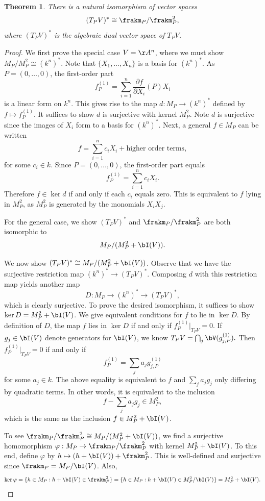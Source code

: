 \documentclass[12pt]{amsart}
\theoremstyle{plain}
\newtheorem{theorem}{Theorem}[subsection]
\theoremstyle{definition}
\begin{document}
\begin{theorem}
There is a natural isomorphism of vector spaces
$$(T_PV)^* \cong \frakm_P/\frakm_P^2,$$
where $(T_PV)^*$ is the algebraic dual vector space of $T_PV$.
\end{theorem}
\begin{proof}
We first prove the special case $V=\AA^n$, where we must show $M_P/M_P^2\cong(k^n)^*$.
Note that $\{X_1, \ldots, X_n\}$ is a basis for $(k^n)^*$.
As $P=(0, \ldots, 0)$, the first-order part
$$f_P^{(1)}=\sum_{i=1}^n \frac{\partial f}{\partial X_i}(P) X_i$$
is a linear form on $k^n$.
This gives rise to the map $d : M_P\to(k^n)^*$ defined by $f \mapsto f_P^{(1)}$.
It suffices to show $d$ is surjective with kernel $M_P^2$.
Note $d$ is surjective since the images of $X_i$ form to a basis for $(k^n)^*$.
Next, a general $f \in M_P$ can be written
$$f=\sum_{i=1}^n c_i X_i + \text{higher order terms},$$
for some $c_i \in k$.
Since $P=(0,\ldots,0)$, the first-order part equals
$$f_P^{(1)} = \sum_{i=1}^n c_i X_i.$$
Therefore $f \in \ker d$ if and only if each $c_i$ equals zero.
This is equivalent to $f$ lying in $M_P^2$, as $M_P^2$ is generated by the monomials $X_i X_j$.

For the general case, we show $(T_PV)^*$ and $\frakm_P/\frakm_P^2$ are both isomorphic to
$$M_P/(M_P^2+\bI(V)).$$

We now show $(T_PV)^* \cong M_P/(M_P^2+\bI(V))$.
Observe that we have the surjective restriction map $(k^n)^* \to (T_PV)^*$.
Composing $d$ with this restriction map yields another map
$$D:M_P \to (k^n)^* \to (T_PV)^*,$$
which is clearly surjective.
To prove the desired isomorphism, it suffices to show $\ker D = M_P^2+\bI(V)$.
We give equivalent conditions for $f$ to lie in $\ker D$.
By definition of $D$, the map $f$ lies in $\ker D$ if and only if $f_P^{(1)} \big|_{T_PV} = 0$.
If $g_j \in \bI(V)$ denote generators for $\bI(V)$, we know $T_PV = \bigcap_j \bV(g_{j,P}^{(1)}).$
Then $f_P^{(1)} \big|_{T_PV}=0$ if and only if 
$$f_P^{(1)} = \sum_j a_j g_{j,P}^{(1)}$$
for some $a_j \in k$.
The above equality is equivalent to $f$ and $\sum_j a_j g_j$ only differing by quadratic terms.
In other words, it is equivalent to the inclusion
$$f - \sum_j a_j g_j \in M_P^2,$$
which is the same as the inclusion $f \in M_P^2 + \bI(V)$.

To see $\frakm_P/\frakm_P^2 \cong M_P/(M_P^2+\bI(V))$, we find a surjective homomorphism $\varphi : M_P \to \frakm_P/\frakm_P^2$ with kernel $M_P^2+\bI(V)$. 
To this end, define $\varphi$ by $h \mapsto (h+\bI(V)) + \frakm_P^2$.
This is well-defined and surjective since $\frakm_P=M_P/\bI(V)$.
Also,
$$\ker \varphi = \{h \in M_P : h + \bI(V) \in \frakm_P^2\}=\{h \in M_P:h+\bI(V)\in M_P^2/\bI(V)\}=M_P^2+\bI(V).$$
\end{proof}
\end{document}
